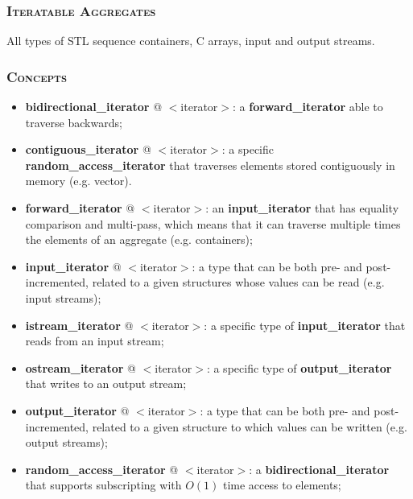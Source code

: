\documentclass[10pt]{article}
\begin{document}
\begin{multicols*}{4}
{\subsubsection*{\textsc{Iteratable Aggregates}} 
\noindent
All types of STL sequence containers, C arrays, input and output streams.

\subsubsection*{\textsc{Concepts}} 
\begin{itemize}[leftmargin=*,topsep=0.25pt]
  \setlength\itemsep{-1.8pt}
	\item \textbf{bidirectional\_iterator} @ $<$iterator$>$: a \textbf{for\-ward\_ite\-ra\-tor} able to traverse backwards; 
	\item \textbf{contiguous\_iterator} @ $<$iterator$>$: a specific \textbf{ran\-dom\_ac\-cess\_i\-te\-ra\-tor} that traverses elements stored contiguously in memory (e.g. vector). 
	\item \textbf{forward\_iterator} @ $<$iterator$>$: an \textbf{input\_iterator} that has equality comparison and multi-pass, which means that it can traverse multiple times the elements of an aggregate (e.g. containers); 
	\item \textbf{input\_iterator} @ $<$iterator$>$: a type that can be both pre- and post-incremented, related to a given structures whose values can be read (e.g. input streams);
	\item \textbf{istream\_iterator} @ $<$iterator$>$: a specific type of \textbf{in\-put\_i\-te\-ra\-tor} that reads from an input stream;
	\item \textbf{ostream\_iterator} @ $<$iterator$>$: a specific type of \textbf{out\-put\_i\-te\-ra\-tor} that writes to an output stream;
	\item \textbf{output\_iterator} @ $<$iterator$>$: a type that can be both pre- and post-incremented, related to a given structure to which values can be written (e.g. output streams);
	\item \textbf{random\_access\_iterator} @ $<$iterator$>$: a \textbf{bidirectional\_iterator} that supports subscripting with $O(1)$ time access to elements; 
\end{itemize}

}
\end{multicols*}
\end{document}
